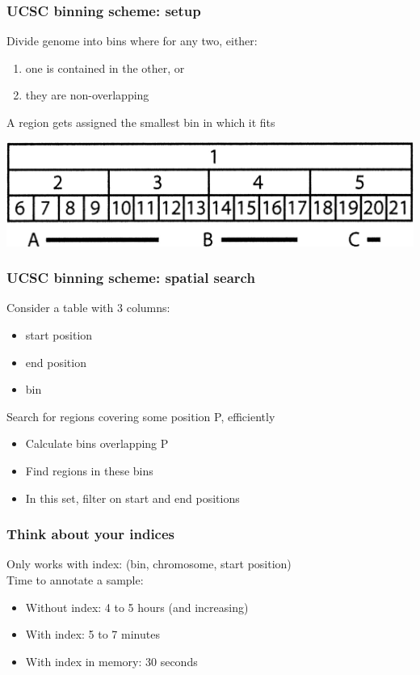 \documentclass[slidestop]{beamer}
\begin{document}
\begin{frame}
  \frametitle{UCSC binning scheme: setup}
  Divide genome into bins where for any two, either:
  \begin{enumerate}
    \item one is contained in the other, or
    \item they are non-overlapping
  \end{enumerate}
  \vspace{0.5cm}
  A region gets assigned the smallest bin in which it fits
  \vspace{0.5cm}
  \begin{center}
    \includegraphics[width=\textwidth]{binning}
  \end{center}
\end{frame}

\begin{frame}
  \frametitle{UCSC binning scheme: spatial search}
  Consider a table with 3 columns:
  \begin{itemize}
    \item start position
    \item end position
    \item bin
  \end{itemize}
  \vspace{0.5cm}
  \pause
  Search for regions covering some position P, efficiently
  \pause
  \begin{itemize}[<+->]
    \item Calculate bins overlapping P
    \item Find regions in these bins
    \item In this set, filter on start and end positions
  \end{itemize}
\end{frame}

\begin{frame}
  \frametitle{Think about your indices}
  Only works with index: (bin, chromosome, start position)\\
  \pause
  \vspace{1cm}
  Time to annotate a sample:
  \begin{itemize}[<+->]
    \item Without index: 4 to 5 hours (and increasing)
    \item With index: 5 to 7 minutes
    \item With index in memory: 30 seconds
  \end{itemize}
\end{frame}
\end{document}
